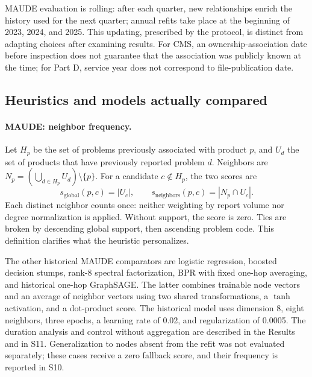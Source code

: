 MAUDE evaluation is rolling: after each quarter, new relationships enrich the history used for the next quarter; annual refits take place at the beginning of 2023, 2024, and 2025. This updating, prescribed by the protocol, is distinct from adapting choices after examining results. For CMS, an ownership-association date before inspection does not guarantee that the association was publicly known at the time; for Part D, service year does not correspond to file-publication date\cite{hgbcode,hgbresults}.

\subsection{Heuristics and models actually compared}
\label{sec:models}

\paragraph{MAUDE: neighbor frequency.} Let $H_p$ be the set of problems previously associated with product $p$, and $U_d$ the set of products that have previously reported problem $d$. Neighbors are $N_p=(\bigcup_{d\in H_p} U_d)\setminus\{p\}$. For a candidate $c\notin H_p$, the two scores are
\begin{equation}
 s_{\mathrm{global}}(p,c)=|U_c|,\qquad
 s_{\mathrm{neighbors}}(p,c)=|N_p\cap U_c|.
\end{equation}
Each distinct neighbor counts once: neither weighting by report volume nor degree normalization is applied. Without support, the score is zero. Ties are broken by descending global support, then ascending problem code\cite{hgbcode}. This definition clarifies what the heuristic personalizes.

The other historical MAUDE comparators are logistic regression, boosted decision stumps, rank-8 spectral factorization, BPR with fixed one-hop averaging, and historical one-hop GraphSAGE\cite{hamilton2017,rendle2009,hgbcode}. The latter combines trainable node vectors and an average of neighbor vectors using two shared transformations, a $\tanh$ activation, and a dot-product score. The historical model uses dimension 8, eight neighbors, three epochs, a learning rate of 0.02, and regularization of 0.0005. The duration analysis and control without aggregation are described in the Results and in S11. Generalization to nodes absent from the refit was not evaluated separately; these cases receive a zero fallback score, and their frequency is reported in S10.

